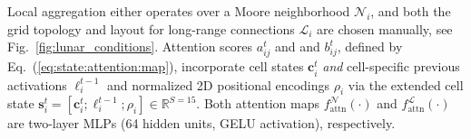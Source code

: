 \documentclass[letterpaper]{article}
\newcommand{\bh}[1]{{\color{black}#1}}  %
\begin{document}
\bh{Local} 
aggregation \bh{either} operates over a
Moore neighborhood $\mathcal{N}_i$\bh{, and both the grid topology and layout for long-range connections $\mathcal{L}_i$ are chosen manually, see Fig.~\ref{fig:lunar_conditions}}.
Attention scores \bh{$a_{ij}^t$ and and $b_{ij}^t$, defined by Eq.~(\ref{eq:state:attention:map})}, incorporate cell states \bh{$\mathbf{c}_i^t$} \emph{and}
\bh{cell-specific previous activations $\ell_i^{t-1}$ and normalized 2D positional encodings $\rho_i$ via the extended cell state $\mathbf{s}_i^t=[\mathbf{c}_i^t;\ell_i^{t-1}; \rho_i]\in\mathbb{R}^{S=15}$.
}
\bh{Both attention maps $f_\text{attn}^\mathcal{N}(\cdot)$ and $f_\text{attn}^\mathcal{L}(\cdot)$ are two-layer MLPs (64 hidden units, GELU activation), respectively.} 



\end{document}
